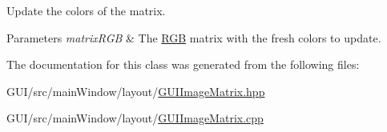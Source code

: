 Update the colors of the matrix. 


\begin{DoxyParams}{Parameters}
{\em matrix\+R\+GB} & The \mbox{\hyperlink{class_r_g_b}{R\+GB}} matrix with the fresh colors to update. \\
\hline
\end{DoxyParams}


The documentation for this class was generated from the following files\+:\begin{DoxyCompactItemize}
\item 
G\+U\+I/src/main\+Window/layout/\mbox{\hyperlink{_g_u_i_image_matrix_8hpp}{G\+U\+I\+Image\+Matrix.\+hpp}}\item 
G\+U\+I/src/main\+Window/layout/\mbox{\hyperlink{_g_u_i_image_matrix_8cpp}{G\+U\+I\+Image\+Matrix.\+cpp}}\end{DoxyCompactItemize}
